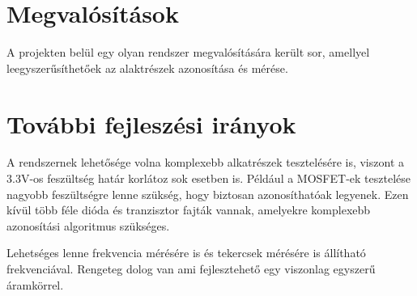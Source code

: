 \section{Megvalósítások}

A projekten belül egy olyan rendszer megvalósítására került sor,
amellyel leegyszerűsíthetőek az alaktrészek azonosítása és mérése.


\section{További fejleszési irányok}

A rendszernek lehetősége volna komplexebb alkatrészek
tesztelésére is, viszont a 3.3V-os feszültség határ
korlátoz sok esetben is. Például a MOSFET-ek tesztelése nagyobb
feszültségre lenne szükség, hogy biztosan azonosíthatóak legyenek.
Ezen kívül több féle dióda és tranzisztor fajták vannak, 
amelyekre komplexebb azonosítási algoritmus szükséges.

Lehetséges lenne frekvencia mérésére is és tekercsek mérésére
is állítható frekvenciával. Rengeteg dolog van ami fejlesztehető
egy viszonlag egyszerű áramkörrel.
